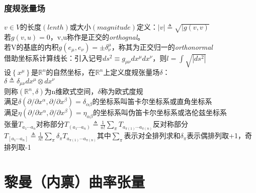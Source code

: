 \documentclass{report}
\newcommand{\xkuo}[1]{\left(#1\right)}
\newcommand{\dkuo}[1]{\left\lbrace#1\right\rbrace}
\newcommand{\akuo}[1]{\left[#1\right]}
\begin{document}
\subsubsection{度规张量场}
\(v\in V\)的长度$\left(lenth\right)$或大小$\left(magnitude\right)$定义：\(|v|\triangleq \sqrt{|g\left(v,v\right)}\)\\若\(g\left(v,u\right)=0\)，v,u称作是正交的\textit{orthognal}。\\若V的基底的内积\(g\left(e_\mu,e_\nu\right)=\pm \delta^\mu_\nu\)，称其为正交归一的\textit{orthonormal}\\
借助坐标系计算线长：引入记号\(ds^2\equiv g_{\mu \nu}dx^\mu dx^\nu\)，则\(l=\int\sqrt{|ds^2|}\)\\
设$\dkuo{x^\mu}$是$\mathbb{R}^n$的自然坐标，在$ \mathbb{R}^n $上定义度规张量场$ \delta $：\\
\(\delta \triangleq\delta_{\mu \nu}dx^\mu\otimes dx^\nu\)\\
则称$\xkuo{\mathbb{R}^n,\delta}$为n维欧式空间，$ \delta $称为欧式度规\\
满足$ \delta\xkuo{\partial /\partial x^\alpha, \partial /\partial x^\beta}=\delta_{\alpha \beta} $的坐标系叫笛卡尔坐标系或直角坐标系\\
满足$ \eta\xkuo{\partial /\partial x^\alpha, \partial /\partial x^\beta}=\eta_{\alpha \beta} $的坐标系叫伪笛卡尔坐标系或洛伦兹坐标系\\
张量$ T_{a_1\cdots a_n} $对称部分$ T_{\xkuo{a_1\cdots a_n}}\triangleq \frac{1}{n!}\sum_{\pi}^{}T_{a_{\pi\xkuo{1}}\cdots a_{\pi\xkuo{n}}} $反对称部分$ T_{\akuo{a_1\cdots a_n}}\triangleq \frac{1}{n!}\sum_{\pi}^{}\delta_\pi T_{a_{\pi\xkuo{1}}\cdots a_{\pi\xkuo{n}}} $其中$\sum_{\pi}$表示对全排列求和$\delta_\pi$表示偶排列取+1，奇排列取-1
\section{黎曼（内禀）曲率张量}
\end{document}
